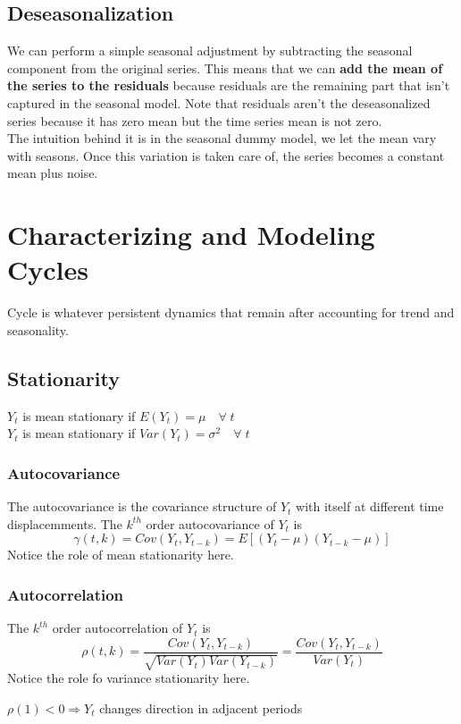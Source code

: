 \documentclass{article}
\begin{document}
\subsection{Deseasonalization}
We can perform a simple seasonal adjustment by subtracting the seasonal component from the original series. This means that we can \textbf{add the mean of the series to the residuals} because residuals are the remaining part that isn't captured in the seasonal model. Note that residuals aren't the deseasonalized series because it has zero mean but the time series mean is not zero.\\

The intuition behind it is in the seasonal dummy model, we let the mean vary with seasons. Once this variation is taken care of, the series becomes a constant mean plus noise.

\section{Characterizing and Modeling Cycles}
Cycle is whatever persistent dynamics that remain after accounting for trend and seasonality.

\subsection{Stationarity}
$Y_t$ is mean stationary if $E(Y_t) = \mu \quad \forall \; t$\\
$Y_t$ is mean stationary if $Var(Y_t) = \sigma^2 \quad \forall \; t$\\

\subsubsection{Autocovariance}
The autocovariance is the covariance structure of $Y_t$ with itself at different time displacemments.
The $k^{th}$ order autocovariance of $Y_t$ is
$$\gamma(t,k) = Cov(Y_t, Y_{t-k}) = E[(Y_t - \mu)(Y_{t-k} - \mu)]$$
Notice the role of mean stationarity here.

\subsubsection{Autocorrelation}
The $k^{th}$ order autocorrelation of $Y_t$ is 
$$\rho(t,k) = \frac{Cov(Y_t, Y_{t-k})}{\sqrt{Var(Y_t)Var(Y_{t-k})}} = \frac{Cov(Y_t, Y_{t-k})}{Var(Y_t)}$$
Notice the role fo variance stationarity here.

$\rho(1) < 0 \Longrightarrow Y_t$ changes direction in adjacent periods
\end{document}

